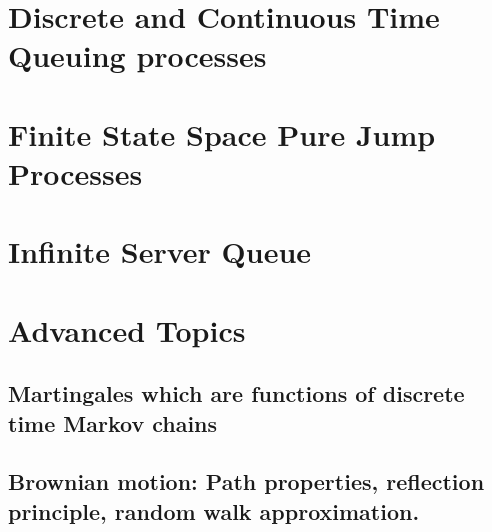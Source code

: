 \chapter{Discrete and Continuous Time Queuing processes}
\chapter{Finite State Space Pure Jump Processes}
\chapter{Infinite Server Queue}
   
\chapter{Advanced Topics}
\section{Martingales which are functions of discrete time Markov chains}
\section{Brownian motion: Path properties, reflection principle, random walk approximation.}